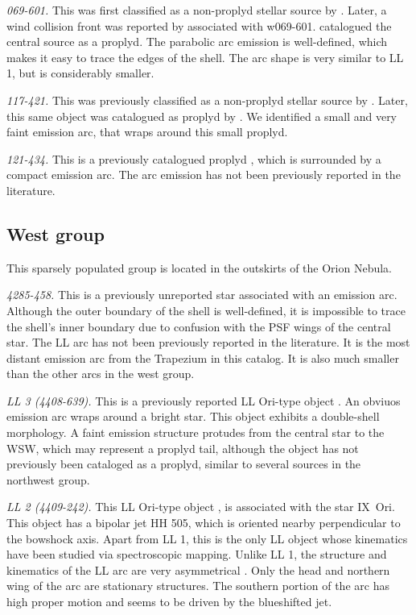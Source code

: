\documentclass[iop, apj]{emulateapj}
\begin{document}
\textit{069-601.} This was first classified as a non-proplyd stellar source by \citet{ODell:1996a}. Later, a wind collision front was reported  by \citet{Bally:2000a} associated with w069-601. \citet{Ricci:2008a} catalogued the central source as a proplyd. The parabolic arc emission is well-defined, which makes it easy to trace the edges of the shell. The arc shape is very similar to LL 1, but is considerably smaller. 

\textit{117-421.} This was previously classified as a non-proplyd stellar source by \citet{ODell:1996a}. Later, this same object was catalogued as proplyd by \citet{Ricci:2008a}. We identified a small and very faint emission arc, that wraps around this small proplyd. 

\textit{121-434.} This is  a previously catalogued proplyd \citep{Ricci:2008a}, which is surrounded by a compact emission arc. The arc emission has not been  previously reported in the literature.

\clearpage
\subsection{West group}
\label{sec:w-group}



This sparsely populated group is located in the outskirts of the Orion Nebula. 

\textit{4285-458.} This is a previously unreported star associated with an emission arc. Although the outer boundary of the shell is well-defined, it is impossible to trace the shell's inner boundary due to confusion with the PSF wings of the central star. The LL arc has not been previously reported in the literature. It is the most distant emission arc from the Trapezium in this catalog. It is also much smaller than the other arcs in the west group.  

\textit{LL 3 (4408-639).} This is a previously reported LL Ori-type object \citep{Bally:2001a}. An obviuos emission arc wraps around a bright star. This object exhibits a double-shell morphology. A faint emission structure protudes from the central star to the WSW, which may represent a proplyd tail, although the object has not previously been cataloged as a proplyd, similar to several sources in the northwest group.    

\textit{LL 2 (4409-242).} This LL Ori-type object \citep{Bally:2001a}, is associated with the star IX~Ori. This object has a bipolar jet HH 505, which is oriented nearby perpendicular to the bowshock axis. Apart from LL 1, this is the only LL object whose kinematics have been studied via spectroscopic mapping. Unlike LL 1, the structure and kinematics of the LL arc are very asymmetrical \citep{Henney:2013a}. Only the head and northern wing of the arc are stationary structures. The southern portion of the arc has high proper motion and seems to be driven by the blueshifted jet.  
\end{document}
